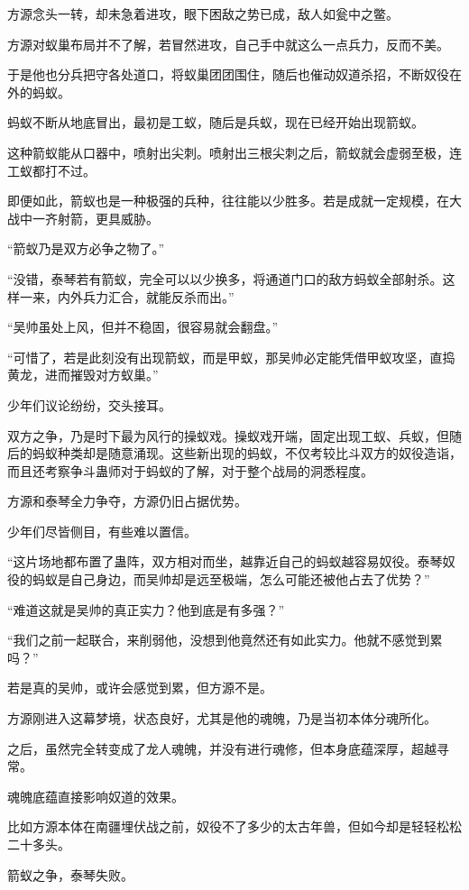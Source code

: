 \begin{this_body}
方源念头一转，却未急着进攻，眼下困敌之势已成，敌人如瓮中之鳖。

方源对蚁巢布局并不了解，若冒然进攻，自己手中就这么一点兵力，反而不美。

于是他也分兵把守各处道口，将蚁巢团团围住，随后也催动奴道杀招，不断奴役在外的蚂蚁。

蚂蚁不断从地底冒出，最初是工蚁，随后是兵蚁，现在已经开始出现箭蚁。

这种箭蚁能从口器中，喷射出尖刺。喷射出三根尖刺之后，箭蚁就会虚弱至极，连工蚁都打不过。

即便如此，箭蚁也是一种极强的兵种，往往能以少胜多。若是成就一定规模，在大战中一齐射箭，更具威胁。

“箭蚁乃是双方必争之物了。”

“没错，泰琴若有箭蚁，完全可以以少换多，将通道门口的敌方蚂蚁全部射杀。这样一来，内外兵力汇合，就能反杀而出。”

“吴帅虽处上风，但并不稳固，很容易就会翻盘。”

“可惜了，若是此刻没有出现箭蚁，而是甲蚁，那吴帅必定能凭借甲蚁攻坚，直捣黄龙，进而摧毁对方蚁巢。”

少年们议论纷纷，交头接耳。

双方之争，乃是时下最为风行的操蚁戏。操蚁戏开端，固定出现工蚁、兵蚁，但随后的蚂蚁种类却是随意涌现。这些新出现的蚂蚁，不仅考较比斗双方的奴役造诣，而且还考察争斗蛊师对于蚂蚁的了解，对于整个战局的洞悉程度。

方源和泰琴全力争夺，方源仍旧占据优势。

少年们尽皆侧目，有些难以置信。

“这片场地都布置了蛊阵，双方相对而坐，越靠近自己的蚂蚁越容易奴役。泰琴奴役的蚂蚁是自己身边，而吴帅却是远至极端，怎么可能还被他占去了优势？”

“难道这就是吴帅的真正实力？他到底是有多强？”

“我们之前一起联合，来削弱他，没想到他竟然还有如此实力。他就不感觉到累吗？”

若是真的吴帅，或许会感觉到累，但方源不是。

方源刚进入这幕梦境，状态良好，尤其是他的魂魄，乃是当初本体分魂所化。

之后，虽然完全转变成了龙人魂魄，并没有进行魂修，但本身底蕴深厚，超越寻常。

魂魄底蕴直接影响奴道的效果。

比如方源本体在南疆埋伏战之前，奴役不了多少的太古年兽，但如今却是轻轻松松二十多头。

箭蚁之争，泰琴失败。


\end{this_body}
